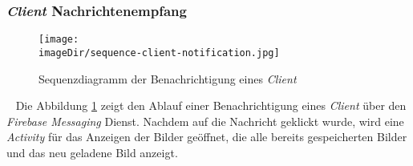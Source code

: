 \subsubsection{\emph{Client} Nachrichtenempfang}
\begin{figure}[h]
	\centering
	\texttt{[image: \\imageDir/sequence-client-notification.jpg]}
	\caption{Sequenzdiagramm der Benachrichtigung eines \emph{Client}}
	\label{fig:image-sequence-client-notification}
\end{figure}
\ \newline
Die Abbildung \ref{fig:image-sequence-client-notification} zeigt den Ablauf einer  Benachrichtigung eines \emph{Client} über den \emph{Firebase Messaging} Dienst. Nachdem auf die Nachricht geklickt wurde, wird eine \emph{Activity} für das Anzeigen der Bilder geöffnet, die alle bereits gespeicherten Bilder und das neu geladene Bild anzeigt. 